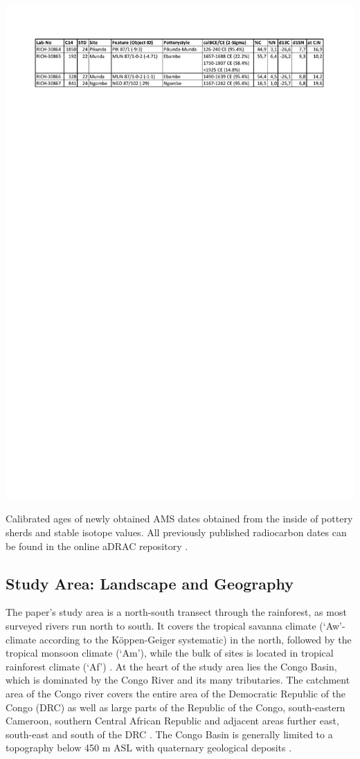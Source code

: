\documentclass[smallextended,natbib]{svjour3}       %
\begin{document}
\begin{table}[!tb]
	\includegraphics[width=\textwidth]{tbl/Tab_New14C.pdf}
	\caption{Calibrated ages of newly obtained AMS dates obtained from the inside of pottery sherds and stable isotope values. All previously published radiocarbon dates can be found in the online aDRAC repository \cite{Seidensticker.2021f}.}
	\label{tab:14C}	
\end{table}

\subsection*{Study Area: Landscape and Geography}

The paper’s study area is a north-south transect through the rainforest, as most surveyed rivers run north to south. It covers the tropical savanna climate (‘Aw’-climate according to the Köppen-Geiger systematic) in the north, followed by the tropical monsoon climate (‘Am’), while the bulk of sites is located in tropical rainforest climate (‘Af’) \citep{Peel.2007}. At the heart of the study area lies the Congo Basin, which is dominated by the Congo River and its many tributaries. The catchment area of the Congo river covers the entire area of the Democratic Republic of the Congo (DRC) as well as large parts of the Republic of the Congo, south-eastern Cameroon, southern Central African Republic and adjacent areas further east, south-east and south of the DRC \citep[60 Fig. 1]{Eggert.2017}. The Congo Basin is generally limited to a topography below 450 m ASL \citep[11]{Runge.2001} with quaternary geological deposits \citep{Persits.1997}.
 
\end{document}

